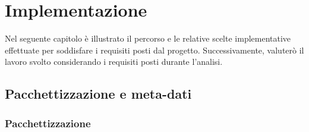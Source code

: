 
\chapter{Implementazione}

Nel seguente capitolo è illustrato il percorso e le relative scelte implementative effettuate per soddisfare i requisiti posti dal progetto. Successivamente, valuterò il lavoro svolto considerando i requisiti posti durante l'analisi.

\section{Pacchettizzazione e meta-dati}

\subsection{Pacchettizzazione}


